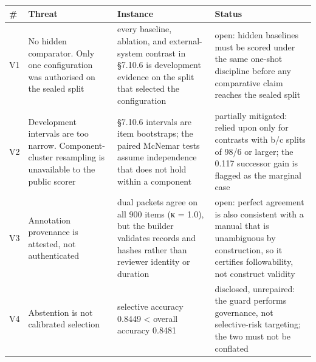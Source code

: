 {\def\LTcaptype{none} %
\begin{longtable}[]{@{}
  >{\raggedright\arraybackslash}p{}
  >{\raggedright\arraybackslash}p{}
  >{\raggedright\arraybackslash}p{}
  >{\raggedright\arraybackslash}p{}@{}}
\toprule\noalign{}
\begin{minipage}[b]{\linewidth}\raggedright
\textbf{\#}
\end{minipage} & \begin{minipage}[b]{\linewidth}\centering
\textbf{Threat}
\end{minipage} & \begin{minipage}[b]{\linewidth}\centering
\textbf{Instance}
\end{minipage} & \begin{minipage}[b]{\linewidth}\centering
\textbf{Status}
\end{minipage} \\
\midrule\noalign{}
\endhead
\bottomrule\noalign{}
\endlastfoot
V1 & No hidden comparator. Only one configuration was authorised on the
sealed split & every baseline, ablation, and external-system contrast in
§7.10.6 is development evidence on the split that selected the
configuration & open: hidden baselines must be scored under the same
one-shot discipline before any comparative claim reaches the sealed
split \\
V2 & Development intervals are too narrow. Component-cluster resampling
is unavailable to the public scorer & §7.10.6 intervals are item
bootstraps; the paired McNemar tests assume independence that does not
hold within a component & partially mitigated: relied upon only for
contrasts with b/c splits of 98/6 or larger; the 0.117 successor gain is
flagged as the marginal case \\
V3 & Annotation provenance is attested, not authenticated & dual packets
agree on all 900 items (κ = 1.0), but the builder validates records and
hashes rather than reviewer identity or duration & open: perfect
agreement is also consistent with a manual that is unambiguous by
construction, so it certifies followability, not construct validity \\
V4 & Abstention is not calibrated selection & selective accuracy 0.8449
\textless{} overall accuracy 0.8481 & disclosed, unrepaired: the guard
performs governance, not selective-risk targeting; the two must not be
conflated \\

\end{longtable}}
